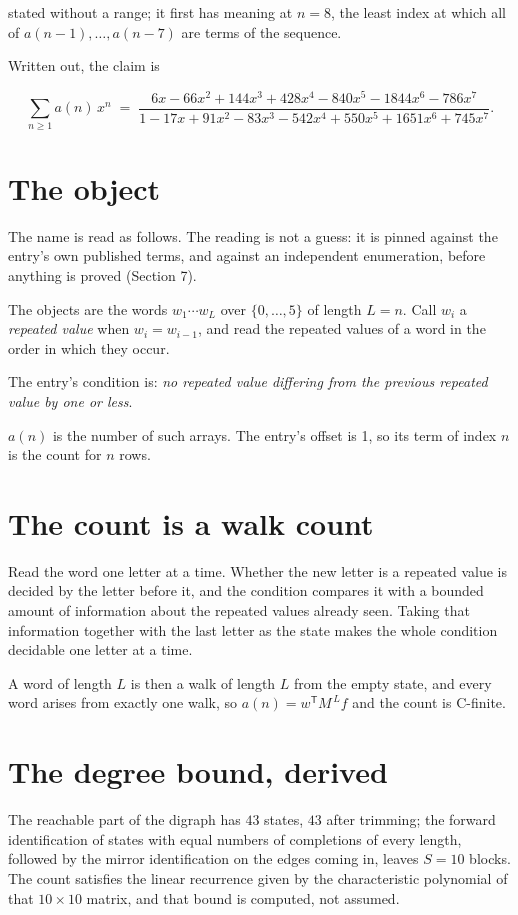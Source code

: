 \documentclass[11pt]{article}
\theoremstyle{definition}
\begin{document}
stated without a range; it first has meaning at $n = 8$, the least index at which all of $a(n-1),\dots,a(n-7)$ are terms of the sequence.

Written out, the claim is

\[\sum_{n \ge 1} a(n)\,x^n \;=\; \frac{6x - 66x^{2} + 144x^{3} + 428x^{4} - 840x^{5} - 1844x^{6} - 786x^{7}}{1 - 17x + 91x^{2} - 83x^{3} - 542x^{4} + 550x^{5} + 1651x^{6} + 745x^{7}}.\]

\section{The object}

The name is read as follows. The reading is not a guess: it is pinned against the entry's own published terms, and against an independent enumeration, before anything is proved (Section 7).

The objects are the words $w_1\cdots w_L$ over $\{0,\dots,5\}$ of length $L = n$. Call $w_i$ a {\itshape repeated value} when $w_i = w_{i-1}$, and read the repeated values of a word in the order in which they occur.

The entry's condition is: {\itshape no repeated value differing from the previous repeated value by one or less}.

$a(n)$ is the number of such arrays. The entry's offset is 1, so its term of index $n$ is the count for $n$ rows.

\section{The count is a walk count}

Read the word one letter at a time. Whether the new letter is a repeated value is decided by the letter before it, and the condition compares it with a bounded amount of information about the repeated values already seen. Taking that information together with the last letter as the state makes the whole condition decidable one letter at a time.

A word of length $L$ is then a walk of length $L$ from the empty state, and every word arises from exactly one walk, so $a(n) = w^{\mathsf T}M^{\,L}f$ and the count is C-finite.

\section{The degree bound, derived}

The reachable part of the digraph has $43$ states, $43$ after trimming; the forward identification of states with equal numbers of completions of every length, followed by the mirror identification on the edges coming in, leaves $S = 10$ blocks. The count satisfies the linear recurrence given by the characteristic polynomial of that $10\times10$ matrix, and that bound is computed, not assumed.
\end{document}
